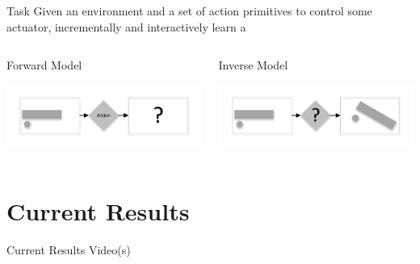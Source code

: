\documentclass{beamer}
\begin{document}
\begin{frame}{Task}
Given an environment and a set of action primitives to control some actuator, incrementally and 
interactively learn a 
\begin{columns}
\begin{column}[c]{.50\textwidth}
\begin{center}
Forward Model
\end{center}
\includegraphics[width=\textwidth]{Forwards} 
\end{column}
\begin{column}[c]{.50\textwidth}
\begin{center}
Inverse Model
\end{center}
\includegraphics[width=\textwidth]{Backwards} 
\end{column}
\end{columns}
\end{frame}

\section{Current Results}
\begin{frame}{Current Results}
Video(s)
\end{frame}
\end{document}
